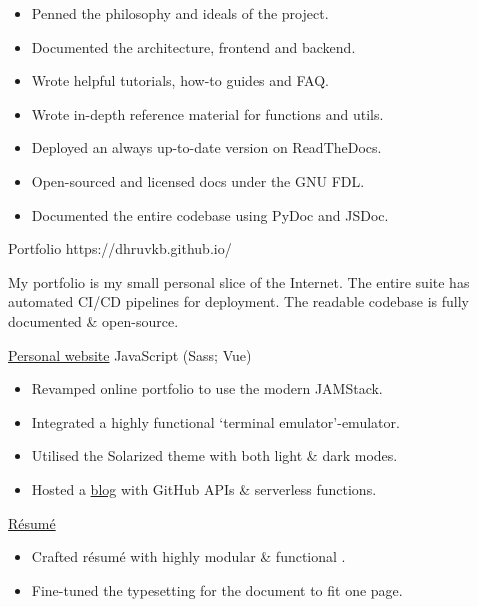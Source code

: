 \begin{sectiondescription}
  \begin{itemize}[nosep, leftmargin = *]
    \item Penned the philosophy and ideals of the project.
    \item Documented the architecture, frontend and backend.
    \item Wrote helpful tutorials, how-to guides and FAQ.
    \item Wrote in-depth reference material for functions and utils.
    \item Deployed an always up-to-date version on ReadTheDocs.
    \item Open-sourced and licensed docs under the GNU FDL.
    \item Documented the entire codebase using PyDoc and JSDoc.
  \end{itemize}
\end{sectiondescription}


\projectsubsection
  {Portfolio}
  {}
  {https://dhruvkb.github.io/}

\begin{sectiondescription}
  My portfolio is my small personal slice of the Internet. The entire suite has
  automated CI/CD pipelines for deployment. The readable codebase is fully
  documented \& open-source.
\end{sectiondescription}

\projectsubsubsection
  {\href{https://github.com/dhruvkb/portfolio/}{Personal website}}
  {JavaScript (Sass; Vue)}

\begin{sectiondescription}
  \begin{itemize}[nosep, leftmargin = *]
    \item Revamped online portfolio to use the modern JAMStack.
    \item Integrated a highly functional `terminal emulator'-emulator.
    \item Utilised the Solarized theme with both light \& dark modes.
    \item Hosted a \href{https://dhruvkb.github.io/#/blog}{blog} with GitHub APIs \& serverless functions.
  \end{itemize}
\end{sectiondescription}

\projectsubsubsection
  {\href{https://github.com/dhruvkb/resume/}{Résumé}}
  {\prettylatex}

\begin{sectiondescription}
  \begin{itemize}[nosep, leftmargin = *]
    \item Crafted résumé with highly modular \& functional \prettylatex{}.
    \item Fine-tuned the typesetting for the document to fit one page.
  \end{itemize}
\end{sectiondescription}